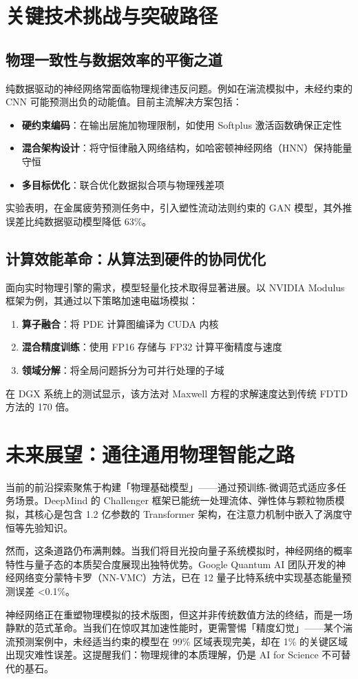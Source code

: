 \chapter{关键技术挑战与突破路径}
\section{物理一致性与数据效率的平衡之道}
纯数据驱动的神经网络常面临物理规律违反问题。例如在湍流模拟中，未经约束的 CNN 可能预测出负的动能值。目前主流解决方案包括：\par
\begin{itemize}
\item \textbf{硬约束编码}：在输出层施加物理限制，如使用 Softplus 激活函数确保正定性
\item \textbf{混合架构设计}：将守恒律融入网络结构，如哈密顿神经网络（HNN）保持能量守恒
\item \textbf{多目标优化}：联合优化数据拟合项与物理残差项
\end{itemize}
实验表明，在金属疲劳预测任务中，引入塑性流动法则约束的 GAN 模型，其外推误差比纯数据驱动模型降低 63\%{}。\par
\section{计算效能革命：从算法到硬件的协同优化}
面向实时物理引擎的需求，模型轻量化技术取得显著进展。以 NVIDIA Modulus 框架为例，其通过以下策略加速电磁场模拟：\par
\begin{enumerate}
\item \textbf{算子融合}：将 PDE 计算图编译为 CUDA 内核
\item \textbf{混合精度训练}：使用 FP16 存储与 FP32 计算平衡精度与速度
\item \textbf{领域分解}：将全局问题拆分为可并行处理的子域
\end{enumerate}
在 DGX 系统上的测试显示，该方法对 Maxwell 方程的求解速度达到传统 FDTD 方法的 170 倍。\par
\chapter{未来展望：通往通用物理智能之路}
当前的前沿探索聚焦于构建「物理基础模型」——通过预训练-微调范式适应多任务场景。DeepMind 的 Challenger 框架已能统一处理流体、弹性体与颗粒物质模拟，其核心是包含 1.2 亿参数的 Transformer 架构，在注意力机制中嵌入了涡度守恒等先验知识。\par
然而，这条道路仍布满荆棘。当我们将目光投向量子系统模拟时，神经网络的概率特性与量子态的本质契合度展现出独特优势。Google Quantum AI 团队开发的神经网络变分蒙特卡罗（NN-VMC）方法，已在 12 量子比特系统中实现基态能量预测误差 <0.1\%{}。\par
神经网络正在重塑物理模拟的技术版图，但这并非传统数值方法的终结，而是一场静默的范式革命。当我们在惊叹其加速性能时，更需警惕「精度幻觉」——某个湍流预测案例中，未经适当约束的模型在 99\%{} 区域表现完美，却在 1\%{} 的关键区域出现灾难性误差。这提醒我们：物理规律的本质理解，仍是 AI for Science 不可替代的基石。\par
